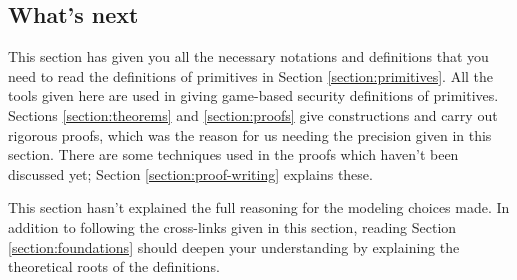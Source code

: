 \subsection*{What's next}
This section has given you all the necessary notations and definitions that you need to read the definitions of primitives in Section \ref{section:primitives}. All the tools given here are used in giving game-based security definitions of primitives. Sections \ref{section:theorems} and \ref{section:proofs} give constructions and carry out rigorous proofs, which was the reason for us needing the precision given in this section. There are some techniques used in the proofs which haven't been discussed yet; Section \ref{section:proof-writing} explains these.

This section hasn't explained the full reasoning for the modeling choices made. In addition to following the cross-links given in this section, reading Section \ref{section:foundations} should deepen your understanding by explaining the theoretical roots of the definitions.
